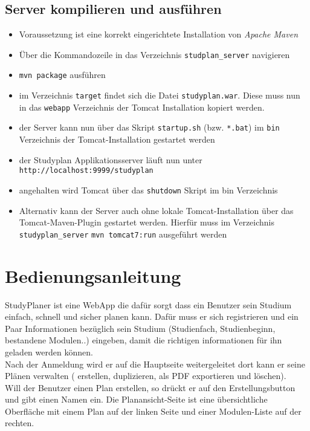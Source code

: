 \subsection{Server kompilieren und ausführen}
\begin{itemize}
	\item Voraussetzung ist eine korrekt eingerichtete Installation von \textit{Apache Maven}
	\item Über die Kommandozeile in das Verzeichnis \texttt{studplan\_server} navigieren
	\item \texttt{mvn package} ausführen
	\item im Verzeichnis \texttt{target} findet sich die Datei \texttt{studyplan.war}. Diese muss nun in das \texttt{webapp} Verzeichnis der Tomcat Installation kopiert werden.
	\item der Server kann nun über das Skript \texttt{startup.sh} (bzw. \texttt{*.bat}) im \texttt{bin} Verzeichnis der Tomcat-Installation gestartet werden
	\item der Studyplan Applikationsserver läuft nun unter \texttt{http://localhost:9999/studyplan}
	\item angehalten wird Tomcat über das \texttt{shutdown} Skript im bin Verzeichnis
	\item Alternativ kann der Server auch ohne lokale Tomcat-Installation über das Tomcat-Maven-Plugin gestartet werden. Hierfür muss im Verzeichnis \texttt{studyplan\_server} \texttt{mvn tomcat7:run} ausgeführt werden
\end{itemize}

\section{Bedienungsanleitung}

StudyPlaner ist eine WebApp die dafür sorgt dass ein Benutzer sein Studium einfach, schnell und sicher planen kann. Dafür muss er sich registrieren und ein Paar Informationen bezüglich sein Studium (Studienfach, Studienbeginn, bestandene Modulen..) eingeben, damit die richtigen informationen für ihn geladen werden können. \\

Nach der Anmeldung wird er auf die Hauptseite weitergeleitet dort kann er seine Plänen verwalten ( erstellen, duplizieren, als PDF exportieren und löschen). \\

Will der Benutzer einen Plan erstellen, so drückt er auf den Erstellungsbutton und gibt einen Namen ein. Die Planansicht-Seite ist eine übersichtliche Oberfläche mit einem Plan auf der linken Seite und einer Modulen-Liste auf der rechten.\\

